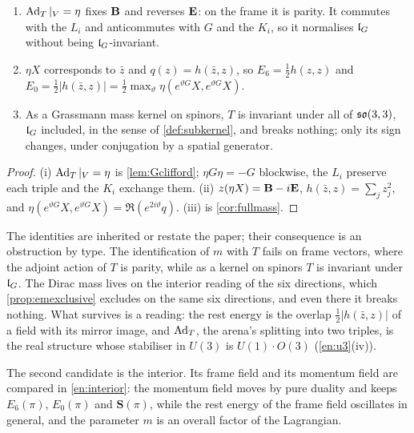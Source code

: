 \begin{proposition}
\label{en:parity}
\begin{enumerate}[label=(\roman*),leftmargin=2.2em]
\item $\operatorname{Ad}_T|_V=\eta$ fixes $\mathbf B$ and reverses $\mathbf E$: on the frame it is parity. It commutes with the $L_i$ and anticommutes with $G$ and the
$K_i$, so it normalises $\mathfrak l_G$ without being $\mathfrak l_G$-invariant.
\item $\eta X$ corresponds to $\bar z$ and $q(z)=h(\bar z,z)$, so $E_6=\tfrac12h(z,z)$ and
$E_0=\tfrac12|h(\bar z,z)|=\tfrac12\max_\vartheta\eta(e^{\vartheta G}X,e^{\vartheta G}X)$.
\item As a Grassmann mass kernel on spinors, $T$ is invariant under all of $\mathfrak{so}(3,3)$, $\mathfrak l_G$ included, in the sense of \cref{def:subkernel}, and
breaks nothing; only its sign changes, under conjugation by a spatial generator.
\end{enumerate}
\end{proposition}

\begin{proof}
(i) $\operatorname{Ad}_T|_V=\eta$ is \cref{lem:Gclifford}; $\eta G\eta=-G$ blockwise, the $L_i$ preserve each triple and the $K_i$ exchange them. (ii)
$z(\eta X)=\mathbf B-i\mathbf E$, $h(\bar z,z)=\sum_jz_j^2$, and $\eta(e^{\vartheta G}X,e^{\vartheta G}X)=\Re(e^{2i\vartheta}q)$. (iii) is \cref{cor:fullmass}.
\end{proof}

The identities are inherited or restate the paper; their consequence is an obstruction by type. The identification of $m$ with $T$ fails on frame
vectors, where the adjoint action of $T$ is parity, while as a kernel on spinors $T$ is invariant under $\mathfrak l_G$. The Dirac mass lives on the interior
reading of the six directions, which \cref{prop:emexclusive} excludes on the same six directions, and even there it breaks nothing. What survives
is a reading: the rest energy is the overlap $\tfrac12|h(\bar z,z)|$ of a field with its mirror image, and $\operatorname{Ad}_T$, the arena's splitting into
two triples, is the real structure whose stabiliser in $U(3)$ is $U(1)\cdot O(3)$ (\cref{en:u3}(iv)).

The second candidate is the interior. Its frame field and its momentum field are compared in \cref{en:interior}: the momentum field moves by pure duality and keeps $E_6(\pi)$, $E_0(\pi)$ and $\mathbf S(\pi)$, while the rest energy of the frame field oscillates in general, and the parameter $m$ is an overall factor of the Lagrangian.

